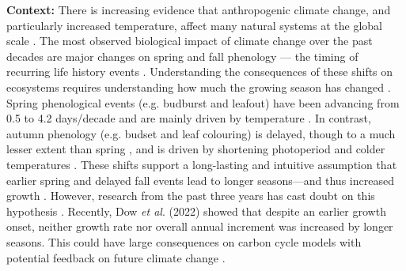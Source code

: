 \documentclass[12pt]{article}
\begin{document}
\textbf {Context:} There is increasing evidence that anthropogenic climate change, and particularly increased temperature, affect many natural systems at the global scale \cite{parmesan_poleward_1999,rosenzweig_attributing_2008}. The most observed biological impact of climate change over the past decades are major changes on spring and fall phenology --- the timing of recurring life history events \cite{parmesan_globally_2003,cleland_shifting_2007,lieth_phenology_1974,woolway_phenological_2021,menzel_european_2006}. Understanding the consequences of these shifts on ecosystems requires understanding how much the growing season has changed \cite{duputie_phenological_2015}. Spring phenological events (e.g. budburst and leafout) have been advancing from 0.5 \cite{wolfe_climate_2005} to 4.2 days/decade \cite{chmielewski_response_2001,fu_recent_2014} and are mainly driven by temperature \cite{chuine_why_2010,cleland_shifting_2007,penuelas_responses_2001}. In contrast, autumn phenology (e.g. budset and leaf colouring) is delayed, though to a much lesser extent than spring \cite{gallinat_autumn_2015,jeong_macroscale_2014}, and is driven by shortening photoperiod \cite{cooke_dynamic_2012,flynn_temperature_2018,korner_phenology_2010} and colder temperatures \cite{cooke_dynamic_2012,delpierre_temperate_2016}. These shifts support a long-lasting and intuitive assumption that earlier spring and delayed fall events lead to longer seasons---and thus increased growth \cite{keenan_net_2014}. However, research from the past three years has cast doubt on this hypothesis \cite{dow_warm_2022,green_limits_2022,silvestro_longer_2023}. Recently, Dow \textit{et al}. (2022) showed that despite an earlier growth onset, neither growth rate nor overall annual increment was increased by longer seasons. This could have large consequences on carbon cycle models with potential feedback on future climate change \cite{richardson_climate_2013,swidrak_comparing_2013}. 
\end{document}
